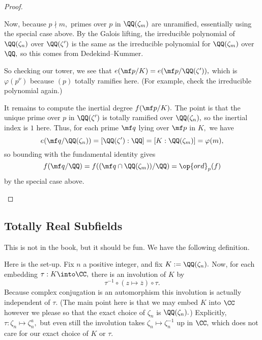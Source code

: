 \documentclass[../notes.tex]{subfiles}
\begin{document}
\begin{proof}
\begin{itemize}
		Now, because $p\nmid m,$ primes over $p$ in $\QQ(\zeta_m)$ are unramified, essentially using the special case above. By the Galois lifting, the irreducible polynomial of $\QQ(\zeta_n)$ over $\QQ(\zeta')$ is the same as the irreducible polynomial for $\QQ(\zeta_m)$ over $\QQ,$ so this comes from Dedekind--Kummer.

		So checking our tower, we see that $e(\mf p/K)=e(\mf p/\QQ(\zeta')),$ which is $\varphi\left(p^\nu\right)$ because $(p)$ totally ramifies here. (For example, check the irreducible polynomial again.)

		It remains to compute the inertial degree $f(\mf p/K).$ The point is that the unique prime over $p$ in $\QQ(\zeta')$ is totally ramified over $\QQ(\zeta_n),$ so the inertial index is $1$ here. Thus, for each prime $\mf q$ lying over $\mf p$ in $K,$ we have
		\[e(\mf q/\QQ(\zeta_n))=[\QQ(\zeta'):\QQ]=[K:\QQ(\zeta_m)]=\varphi(m),\]
		so bounding with the fundamental identity\todo{} gives
		\[f(\mf q/\QQ)=f((\mf q\cap\QQ(\zeta_m))/\QQ)=\op{ord}_p(f)\]
		by the special case above. 
		\qedhere
	\end{itemize}
\end{proof}

\subsection{Totally Real Subfields}
This is not in the book, but it should be fun. We have the following definition.

Here is the set-up. Fix $n$ a positive integer, and fix $K:=\QQ(\zeta_n).$ Now, for each embedding $\tau:K\into\CC,$ there is an involution of $K$ by
\[\tau^{-1}\circ(z\mapsto\overline z)\circ\tau.\]
Because complex conjugation is an automorphism this involution is actually independent of $\tau.$ (The main point here is that we may embed $K$ into $\CC$ however we please so that the exact choice of $\zeta_n$ is $\QQ(\zeta_n).$) Explicitly, $\tau:\zeta_n\mapsto\zeta_n^a,$ but even still the involution takes $\zeta_n\mapsto\zeta_n^{-1}$ up in $\CC,$ which does not care for our exact choice of $K$ or $\tau.$
\end{document}
